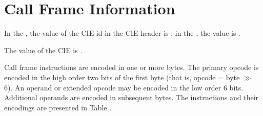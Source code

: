 \section{Call Frame Information}
\label{datarep:callframeinformation}

In the \thirtytwobitdwarfformat, the value of the CIE id in the
CIE header is \xffffffff; in the \sixtyfourbitdwarfformat, the
value is \xffffffffffffffff.

The value of the CIE 
is \versiondotdebugframe.

Call frame instructions are encoded in one or more bytes. The
primary opcode is encoded in the high order two bits of
the first byte (that is, opcode = byte $\gg$ 6). An operand
or extended opcode may be encoded in the low order 6
bits. Additional operands are encoded in subsequent bytes.
The instructions and their encodings are presented in
Table .

